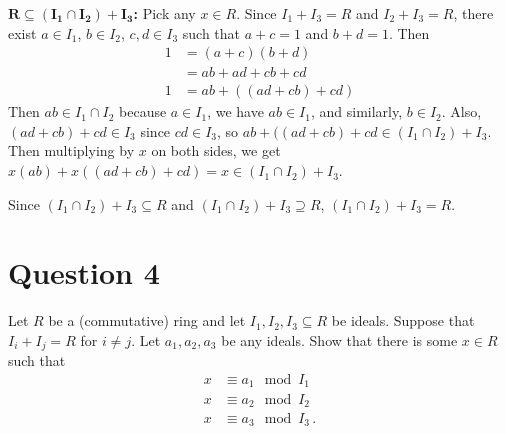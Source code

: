 \documentclass [12pt] {article}
\renewcommand{\bf}[1]{\textbf{{#1}}}
\begin{document}
\bf{$\bm{R \subseteq (I_1 \cap I_2) + I_3 }$:}
Pick any $x \in R$. Since $I_1 + I_3 = R$ and $I_2 + I_3 = R$, there exist $a \in I_1$, $b \in I_2$, 
$c, d \in I_3$ such that $a + c = 1$ and $b + d = 1$. Then
\begin{align*}
    1 &= (a + c)(b + d) \\
      &= ab + ad + cb + cd \\
    1 &= ab + ((ad + cb) + cd)
\end{align*}
Then $ab \in I_1 \cap I_2$ because $a \in I_1$, we have $ab \in I_1$, and similarly, $b \in I_2$. 
Also, $(ad + cb) + cd \in I_3$ since $cd \in I_3$, so 
$ab + ((ad + cb) + cd \in (I_1 \cap I_2) + I_3$. Then multiplying by $x$ on both sides,
we get $x(ab) + x((ad + cb) + cd) = x \in (I_1 \cap I_2) + I_3$.
\vspace{1em}

Since $(I_1 \cap I_2) + I_3 \subseteq R$ and $(I_1 \cap I_2) + I_3 \supseteq R$, 
$(I_1 \cap I_2) + I_3 = R$.

\newpage
\section*{Question 4}
Let $R$ be a (commutative) ring and let $I_1,I_2,I_3\subseteq R$ be ideals. Suppose that $I_i+I_j=R$
for $i\neq j$. Let $a_1,a_2,a_3$ be any ideals. Show that there is some $x\in R$ such that 
\begin{align*}
    x &\equiv a_1\mod I_1 \\
    x &\equiv a_2\mod I_2 \\ 
    x &\equiv a_3\mod I_3\,.
\end{align*}
\end{document}
